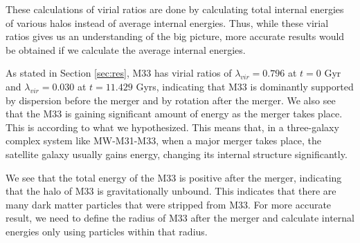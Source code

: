 \documentclass[twocolumn]{aastex631}
\begin{document}
These calculations of virial ratios are done by calculating total internal energies of various halos instead of average internal energies. Thus, while these virial ratios gives us an understanding of the big picture, more accurate results would be obtained if we calculate the average internal energies.

As stated in Section \ref{sec:res}, M33 has virial ratios of $\lambda_{vir} = 0.796$ at $t=0$ Gyr and $\lambda_{vir} = 0.030$ at $t=11.429$ Gyrs, indicating that M33 is dominantly supported by dispersion before the merger and by rotation after the merger. We also see that the M33 is gaining significant amount of energy as the merger takes place. This is according to what we hypothesized. This means that, in a three-galaxy complex system like MW-M31-M33, when a major merger takes place, the satellite galaxy usually gains energy, changing its internal structure significantly. 

We see that the total energy of the M33 is positive after the merger, indicating that the halo of M33 is gravitationally unbound. This indicates that there are many dark matter particles that were stripped from M33. For more accurate result, we need to define the radius of M33 after the merger and calculate internal energies only using particles within that radius. 


{}

\end{document}
